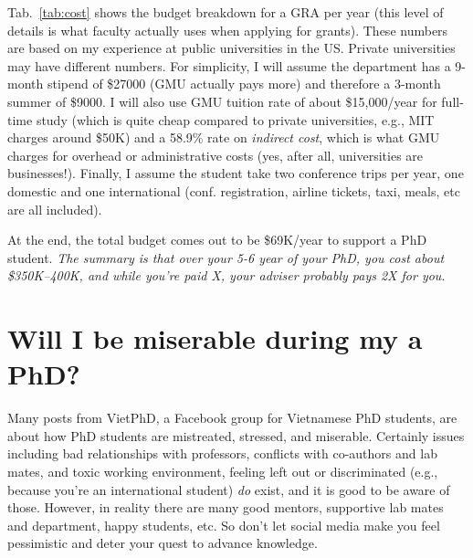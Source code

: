 \documentclass[oneside,11pt]{memoir}
\newcommand{\mycomment}[3][\color{blue}]{{#1{{#2}: {#3}}}}
\newcommand{\tvn}[1]{\mycomment{TVN}{#1}}{}
\begin{document}
Tab.~\ref{tab:cost} shows the budget breakdown for a GRA per year (this level of details is what faculty actually uses when applying for grants).
These numbers are based on my experience at public universities in the US.  Private universities may have different numbers.  For simplicity, I will assume the department has a 9-month stipend of \$27000 (GMU actually pays more) and therefore a 3-month summer of \$9000. I will also use GMU tuition rate of about \$15,000/year for full-time study (which is quite cheap compared to private universities, e.g., MIT charges around \$50K) and a 58.9\% rate on \emph{indirect cost}, which is what GMU charges for overhead or administrative costs (yes, after all, universities are businesses!).  Finally, I assume the student take two conference trips per year, one domestic and one international (conf. registration, airline tickets, taxi, meals, etc are all included). 

At the end, the total budget comes out to be \$69K/year to support a PhD student. \emph{The summary is that over your 5-6 year of your PhD, you cost about \$350K--400K, and while you're paid X, your adviser probably pays 2X for you}.  





\section{Will I be miserable during my a PhD?}\label{sec:happy}
Many posts from VietPhD, a Facebook group for Vietnamese PhD students, are about how PhD students are mistreated, stressed, and miserable. Certainly issues including bad relationships with professors, conflicts with co-authors and lab mates, and toxic working environment, feeling left out or discriminated (e.g., because you're an international student) \emph{do} exist, and it is good to be aware of those.  However, in reality there are many good mentors, supportive lab mates and department, happy students, etc.  So don't let social media make you feel pessimistic and deter your quest to advance knowledge.  
\end{document}
